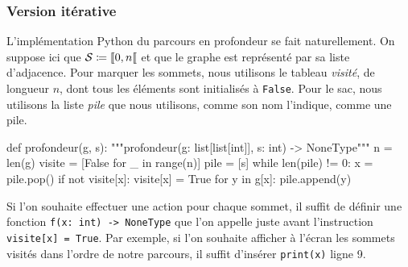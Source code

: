 \documentclass{magnolia}
\begin{document}
\subsubsection{Version itérative}

L'implémentation Python du parcours en profondeur se fait naturellement. On suppose
ici que $\mathcal{S}\coloneqq\left\llbracket 0,n\right\llbracket$ et que le graphe est représenté par sa liste
d'adjacence. Pour marquer les sommets, nous utilisons le tableau \emph{visité}, de
longueur $n$, dont tous les éléments sont initialisés à \verb!False!. Pour le sac,
nous utilisons la liste \emph{pile} que nous utilisons, comme son nom l'indique, comme
une pile.

\begin{pythoncodeline}
def profondeur(g, s):
    """profondeur(g: list[list[int]], s: int) -> NoneType"""
    n = len(g)
    visite = [False for _ in range(n)]
    pile = [s]
    while len(pile) != 0:
        x = pile.pop()
        if not visite[x]:
            visite[x] = True
            for y in g[x]:
                pile.append(y)
\end{pythoncodeline}
\noindent
Si l'on souhaite effectuer une action pour chaque
sommet, il suffit de définir une fonction \verb!f(x: int) -> NoneType! que l'on appelle
juste avant l'instruction \verb!visite[x] = True!. Par exemple, si l'on souhaite afficher
à l'écran les sommets visités dans l'ordre de notre parcours, il suffit d'insérer \verb!print(x)! ligne 9.

\begin{center}
\end{center}
\end{document}

